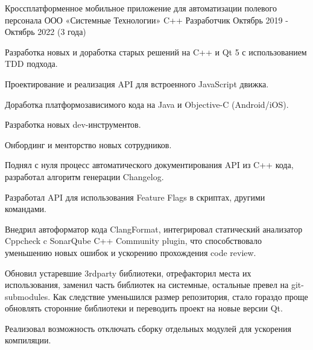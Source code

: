 

\begin{cventries}

\cventry
    {Кроссплатформенное мобильное приложение для автоматизации полевого персонала} %
    {ООО «Системные Технологии»} %
    {C++ Разработчик} %
    {Октябрь 2019 - Октябрь 2022 (3 года)} %
    {
    \begin{cvitems} %
        \item {Разработка новых и доработка старых решений на C++ и Qt 5 с использованием TDD подхода.}
        \item {Проектирование и реализация API для встроенного JavaScript движка.}
        \item {Доработка платформозависимого кода на Java и Objective-C (Android/iOS).}
        \item {Разработка новых dev-инструментов.}
        \item {Онбординг и менторство новых сотрудников.}
        \\
        \item {Поднял с нуля процесс автоматического документирования API из C++ кода, разработал алгоритм генерации Changelog.}
        \item {Разработал API для использования Feature Flags в скриптах, другими командами.}
        \item {Внедрил автоформатор кода ClangFormat, интегрировал статический анализатор Cppcheck c SonarQube C++ Community plugin,
                что способствовало уменьшению новых ошибок и ускорению прохождения code review.}
        \item {Обновил устаревшие 3rdparty библиотеки, отрефакторил места их использования, заменил часть библиотек на системные,
                остальные превел на git-submodules. Как следствие уменьшился размер репозитория, стало гораздо проще обновлять сторонние библиотеки
                и переводить проект на новые версии Qt.}
        \item {Реализовал возможность отключать сборку отдельных модулей для ускорения компиляции.}

\end{cvitems}}
\end{cventries}
